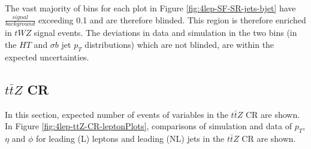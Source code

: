 The vast majority of bins for each plot in Figure \ref{fig:4lep-SF-SR-jets-bjet} have $\frac{signal}{background}$ exceeding 0.1 and are therefore blinded. This region is therefore enriched in $tWZ$ signal events. The deviations in data and simulation in the two bins (in the $HT$ and $\sigma b$ jet $p_{T}$ distributions) which are not blinded, are within the expected uncertainties.


\subsection{$t\bar{t}Z$ CR}
\label{sec:controlplotstetralepton-ttZ-CR}


In this section, expected number of events of variables in the $t\bar{t}Z$ CR are shown. In Figure \ref{fig:4lep-ttZ-CR-leptonPlots}, comparisons of simulation and data of $p_{T}$, $\eta$ and $\phi$ for leading (L) leptons and leading (NL) jets in the $t\bar{t}Z$ CR are shown.

